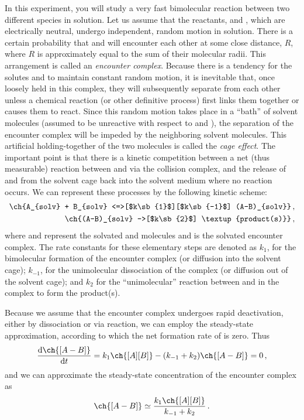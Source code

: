 \documentclass[nobib,nofonts,nols,nohyper]{tufte-handout}
\begin{document}
In this experiment, you will study a very fast bimolecular reaction between two different species in solution. 
Let us assume that the reactants,  and , which are electrically neutral, undergo independent, random motion in solution. 
There is a certain probability that  and  will encounter each other at some close distance, \(R\), where \(R\) is approximately equal to the sum of their molecular radii. 
This arrangement is called an \emph{encounter complex}. 
Because there is a tendency for the solutes  and  to maintain constant random motion, it is inevitable that, once
loosely held in this complex, they will subsequently separate from each other unless a chemical
reaction (or other definitive process) first links them together or causes them to react. 
Since this random motion takes place in a ``bath'' of solvent molecules (assumed to be unreactive with respect
to  and ), the separation of the  encounter complex will be impeded by the neighboring
solvent molecules. 
This artificial holding-together of the two molecules is called the \emph{cage effect}.
The important point is that there is a kinetic competition between a net (thus measurable) reaction
between  and  via the collision complex, and the release of  and  from the solvent cage back
into the solvent medium where no reaction occurs. 
We can represent these processes by the following kinetic scheme:
\begin{align}
\begin{split}
	\ch{A_{solv} + B_{solv} <=>[$k\sb{1}$][$k\sb{-1}$] (A-B)_{solv}} \, , \\
	\ch{(A-B)_{solv} ->[$k\sb{2}$] \textup{product(s)}} \, ,
\end{split}
\label{eq:rxn_scheme}
\end{align}
where  and  represent the solvated  and  molecules and  is the solvated encounter complex. 
The rate constants for these elementary steps are denoted as \( k_1 \), for the bimolecular formation of the encounter complex (or diffusion into the solvent cage); \( k_{-1} \), for the unimolecular dissociation of the complex (or diffusion out of the solvent cage); and \( k_2 \) for the ``unimolecular'' reaction between  and  in the complex to form the product(s). 

Because we assume that the encounter complex undergoes rapid deactivation, either by
dissociation or via reaction, we can employ the steady-state approximation, according to which
the net formation rate of  is zero. Thus
\[
	\dv{\ch{[A-B]}}{t} = k_1 \ch{[A][B]} - (k_{-1} + k_2)\ch{[A-B]} = 0 \, ,
\]
and we can approximate the steady-state concentration of the encounter complex as 
\[
	\ch{[A-B]} \simeq \frac{k_1\ch{[A][B]}}{k_{-1}+k_2} \, .
\]
\end{document}

